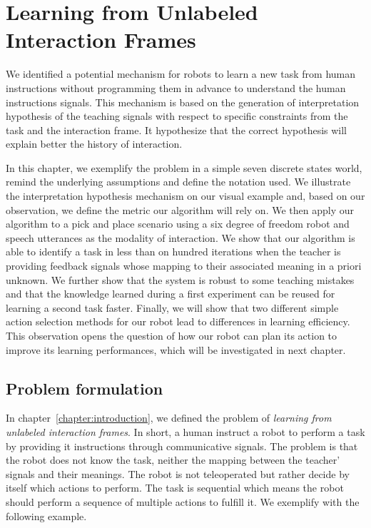 
\chapter{Learning from Unlabeled Interaction Frames}
\label{chapter:lfui}
\minitoc

We identified a potential mechanism for robots to learn a new task from human instructions without programming them in advance to understand the human instructions signals. This mechanism is based on the generation of interpretation hypothesis of the teaching signals with respect to specific constraints from the task and the interaction frame. It hypothesize that the correct hypothesis will explain better the history of interaction.

In this chapter, we exemplify the problem in a simple seven discrete states world, remind the underlying assumptions and define the notation used. We illustrate the interpretation hypothesis mechanism on our visual example and, based on our observation, we define the metric our algorithm will rely on. We then apply our algorithm to a pick and place scenario using a six degree of freedom robot and speech utterances as the modality of interaction. We show that our algorithm is able to identify a task in less than on hundred iterations when the teacher is providing feedback signals whose mapping to their associated meaning in a priori unknown. We further show that the system is robust to some teaching mistakes and that the knowledge learned during a first experiment can be reused for learning a second task faster. Finally, we will show that two different simple action selection methods for our robot lead to differences in learning efficiency. This observation opens the question of how our robot can plan its action to improve its learning performances, which will be investigated in next chapter.

\section{Problem formulation}

In chapter~\ref{chapter:introduction}, we defined the problem of \emph{learning from unlabeled interaction frames}. In short, a human instruct a robot to perform a task by providing it instructions through communicative signals. The problem is that the robot does not know the task, neither the mapping between the teacher' signals and their meanings. The robot is not teleoperated but rather decide by itself which actions to perform. The task is sequential which means the robot should perform a sequence of multiple actions to fulfill it. We exemplify with the following example.

